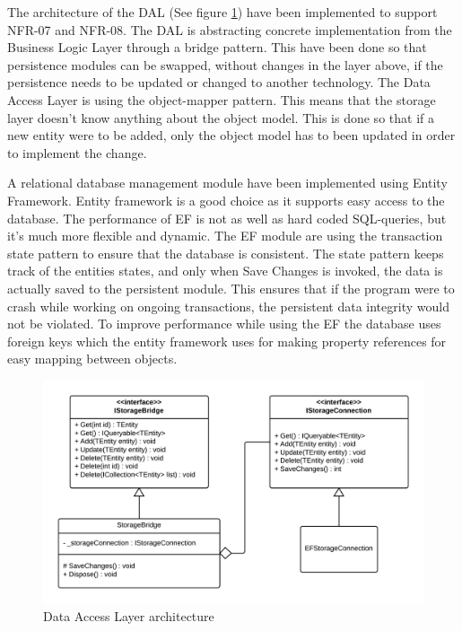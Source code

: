 \documentclass[../report.tex]{subfiles}
\begin{document}
\graphicspath{{img/}{../img/}}

The architecture of the DAL (See figure \ref{fig:DALclassdiagram}) have been implemented to support NFR-07 and NFR-08. The DAL is abstracting concrete implementation from the Business Logic Layer through a bridge pattern. This have been done so that persistence modules can be swapped, without changes in the layer above, if the persistence needs to be updated or changed to another technology. The Data Access Layer is using the object-mapper pattern. This means that the storage layer doesn't know anything about the object model. This is done so that if a new entity were to be added, only the object model has to been updated in order to implement the change. 

A relational database management module have been implemented using Entity Framework. Entity framework is a good choice as it supports easy access to the database. The performance of EF is not as well as hard coded SQL-queries, but it's much more flexible and dynamic. The EF module are using the transaction state pattern to ensure that the database is consistent. The state pattern keeps track of the entities states, and only when Save Changes is invoked, the data is actually saved to the persistent module. This ensures that if the program were to crash while working on ongoing transactions, the persistent data integrity would not be violated. To improve performance while using the EF the database uses foreign keys which the entity framework uses for making property references for easy mapping between objects.

\begin{figure}
\centering
\includegraphics[width=\linewidth]{DALclassdiagram.png}
\caption{Data Access Layer architecture}
\label{fig:DALclassdiagram}
\end{figure} 
\end{document}
